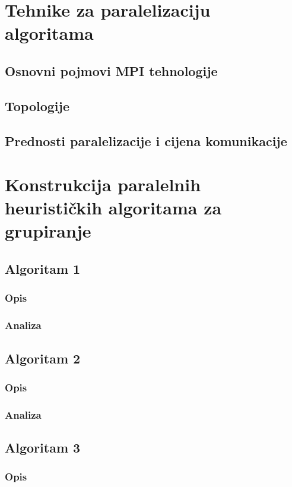 \documentclass[a4paper,twoside,12pt]{memoir} %
\begin{document}
\chapter{Tehnike za paralelizaciju algoritama}
\section[Osnovni pojmovi MPI tehnologije][mpi]{Osnovni pojmovi MPI tehnologije}
\section[Topologija][topologija]{Topologije}
\section[Prednosti paralelizacije i cijena komunikacije][pred-man-paralel]{Prednosti paralelizacije i cijena komunikacije}
\chapter{Konstrukcija paralelnih heurističkih algoritama za grupiranje}
\section{Algoritam 1}
\subsection{Opis}
\subsection{Analiza}
\section{Algoritam 2}
\subsection{Opis}
\subsection{Analiza}
\section{Algoritam 3}
\subsection{Opis}
\end{document}
